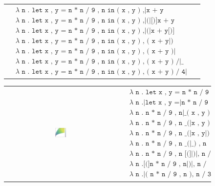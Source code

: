 \begin{figure}
\begin{tabular}{cp{}}
{\begin{align*}
      & \texttt{$\lambda$ n . let x , y = n * n / 9 , n in ( x , y ) ,|x + y } \\
      & \texttt{$\lambda$ n . let x , y = n * n / 9 , n in ( x , y ) ,|(|[)]x + y } \\
      & \texttt{$\lambda$ n . let x , y = n * n / 9 , n in ( x , y ) ,|(|x + y[)]} \\
      & \texttt{$\lambda$ n . let x , y = n * n / 9 , n in ( x , y ) , ( x + y|)} \\
      & \texttt{$\lambda$ n . let x , y = n * n / 9 , n in ( x , y ) , ( x + y )|} \\
      & \texttt{$\lambda$ n . let x , y = n * n / 9 , n in ( x , y ) , ( x + y ) /|\_} \\
      & \texttt{$\lambda$ n . let x , y = n * n / 9 , n in ( x , y ) , ( x + y ) / 4|}
    \end{align*}
  }
  \end{tabular}
\end{figure}

\begin{figure}
  \begin{tabular}{cp{}}
  \includegraphics[width=0.1\textwidth]{img/circles-parabola-grow-1.png}
  &
  {
    \begin{align*}
      & \texttt{$\lambda$ n . let x , y = n * n / 9 , n|in ( x , y ) , n / 3} \\
      & \texttt{$\lambda$ n .|let x , y =|n * n / 9 , n[in] ( x , y ) , n / 3} \\
      & \texttt{$\lambda$ n . n * n / 9 , n|\_ ( x , y ) , n / 3} \\
      & \texttt{$\lambda$ n . n * n / 9 , n \_ (|x , y ) , n / 3} \\
      & \texttt{$\lambda$ n . n * n / 9 , n \_ (|x , y|) , n / 3} \\
      & \texttt{$\lambda$ n . n * n / 9 , n \_ (|\_ ) , n / 3} \\
      & \texttt{$\lambda$ n . n * n / 9 , n [(]|)|, n / 3} \\
      & \texttt{$\lambda$ n .[(]n * n / 9 , n|)|, n / 3} \\
      & \texttt{$\lambda$ n .|( n * n / 9 , n ), n / 3}
    \end{align*}
  }
  \end{tabular}
\end{figure}


